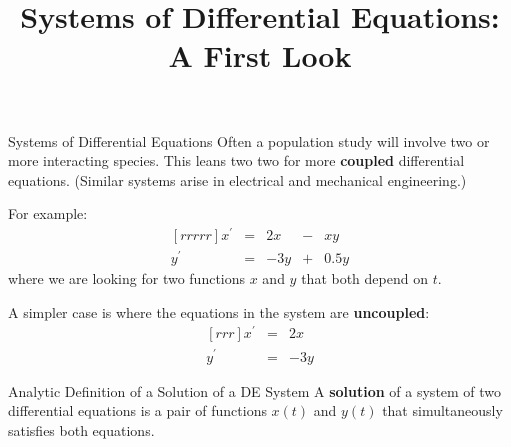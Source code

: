 \documentclass{beamer}
\title[MATH 2250 - Section 2.6]{Systems of Differential Equations: A First Look}
\begin{document}
\begin{frame}
\titlepage
\end{frame}

\begin{frame}
\begin{block}{Systems of Differential Equations}
Often a population study will involve two or more interacting species. This leans two two for more \textbf{coupled} differential equations. (Similar systems arise in electrical and mechanical engineering.)\pause

\vspace{2mm}
For example:
\begin{equation*}
\begin{matrix}[rrrrr]
x^\prime &=& 2x &-& xy \\
y^\prime &=& -3y &+& 0.5y
\end{matrix}
\end{equation*}
where we are looking for two functions $x$ and $y$ that both depend on $t$.\pause

\vspace{2mm}
A simpler case is where the equations in the system are \textbf{uncoupled}:
\begin{equation*}
\begin{matrix}[rrr]
x^\prime &=& 2x \\
y^\prime &=& -3y
\end{matrix}
\end{equation*}
\end{block}\pause

\begin{block}{Analytic Definition of a Solution of a DE System}
A \textbf{solution} of a system of two differential equations is a pair of functions $x(t)$ and $y(t)$ that simultaneously satisfies both equations.
\end{block}
\end{frame}
\end{document}
